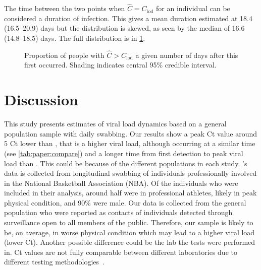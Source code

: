 \documentclass[thesis.tex]{subfiles}
\begin{document}
The time between the two points when $\hat{C} = C_\text{lod}$ for an individual can be considered a duration of infection.
This gives a mean duration estimated at 18.4 (16.5--20.9) days but the distribution is skewed, as seen by the median of 16.6 (14.8--18.5) days.
The full distribution is in \cref{fig:paper:duration}.
\begin{figure}
    \centering
    \caption{Proportion of people with $\hat{C} > C_\text{lod}$ a given number of days after this first occurred. Shading indicates central 95\% credible interval.}
    \label{fig:paper:duration}
\end{figure}

\section{Discussion}

This study presents estimates of viral load dynamics based on a general population sample with daily swabbing.
Our results show a peak Ct value around 5 Ct lower than \textcite{kisslerViral}, that is a higher viral load, although occurring at a similar time (see \cref{tab:paper:compare}) and a longer time from first detection to peak viral load than \textcite{jonesEstimating}.
This could be because of the different populations in each study. \Textcite{kisslerViral}'s data is collected from longitudinal swabbing of individuals professionally involved in the National Basketball Association (NBA).
Of the individuals who were included in their analysis, around half were in professional athletes, likely in peak physical condition, and 90\% were male.
Our data is collected from the general population who were reported as contacts of individuals detected through surveillance open to all members of the public.
Therefore, our sample is likely to be, on average, in worse physical condition which may lead to a higher viral load (lower Ct).
Another possible difference could be the lab the tests were performed in.
Ct values are not fully comparable between different laboratories due to different testing methodologies~\autocites{dahdouhCt,hanRTPCR}.
\end{document}
